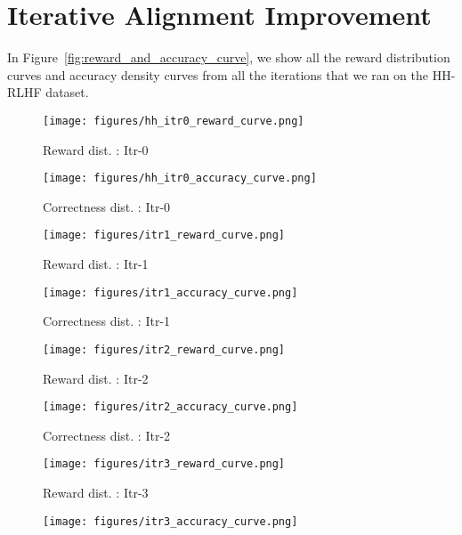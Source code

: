 \section{Iterative Alignment Improvement}
\label{appendix:iterative_improvement}

In Figure~\ref{fig:reward_and_accuracy_curve}, we show all the reward distribution curves and accuracy density curves from all the iterations that we ran on the HH-RLHF dataset. 

\begin{figure*}[t]
\centering
\begin{subfigure}{0.23\linewidth}
\centering
\texttt{[image: figures/hh\_itr0\_reward\_curve.png]}
\caption{Reward dist. : Itr-0}
\label{fig:itr0_reward_curve}
\end{subfigure}
\begin{subfigure}{0.23\linewidth}
\centering
\texttt{[image: figures/hh\_itr0\_accuracy\_curve.png]}
\caption{Correctness dist. : Itr-0}
\label{fig:itr0_accuracy_curve}
\end{subfigure}
\begin{subfigure}{0.23\linewidth}
\centering
\texttt{[image: figures/itr1\_reward\_curve.png]}
\caption{Reward dist. : Itr-1}
\label{fig:itr1_reward_curve}
\end{subfigure}
\begin{subfigure}{0.23\linewidth}
\centering
\texttt{[image: figures/itr1\_accuracy\_curve.png]}
\caption{Correctness dist. : Itr-1}
\label{fig:itr1_accuracy_curve}
\end{subfigure}
\begin{subfigure}{0.23\linewidth}
\centering
\texttt{[image: figures/itr2\_reward\_curve.png]}
\caption{Reward dist. : Itr-2}
\label{fig:itr2_reward_curve}
\end{subfigure}
\begin{subfigure}{0.23\linewidth}
\centering
\texttt{[image: figures/itr2\_accuracy\_curve.png]}
\caption{Correctness dist. : Itr-2}
\label{fig:itr2_accuracy_curve}
\end{subfigure}
\begin{subfigure}{0.23\linewidth}
\centering
\texttt{[image: figures/itr3\_reward\_curve.png]}
\caption{Reward dist. : Itr-3}
\label{fig:itr3_reward_curve}
\end{subfigure}
\begin{subfigure}{0.23\linewidth}
\centering
\texttt{[image: figures/itr3\_accuracy\_curve.png]}

\end{subfigure}
\end{figure*}

